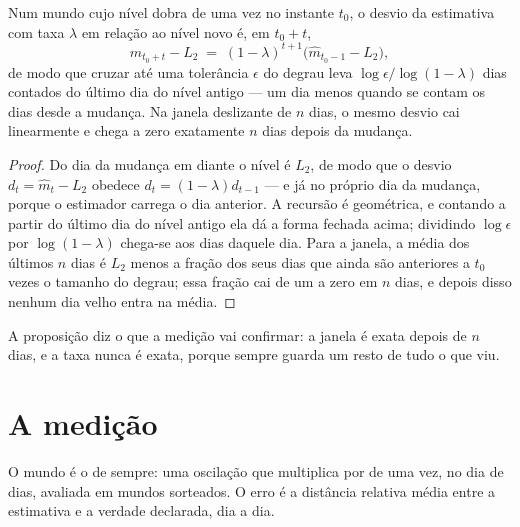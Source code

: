 \begin{proposicao}\label{prop:meia-vida}
Num mundo cujo nível dobra de uma vez no instante $t_0$, o desvio da estimativa com taxa $\lambda$
em relação ao nível novo é, em $t_0 + t$,
\[
\hat m_{t_0+t} - L_2 \;=\; (1-\lambda)^{t+1}\big(\hat m_{t_0-1} - L_2\big),
\]
de modo que cruzar até uma tolerância $\epsilon$ do degrau leva
$\log \epsilon / \log(1-\lambda)$ dias contados do último dia do nível antigo --- um dia menos
quando se contam os dias desde a mudança. Na janela deslizante de $n$ dias, o mesmo desvio cai
linearmente e chega a zero exatamente $n$ dias depois da mudança.
\end{proposicao}

\begin{proof}
Do dia da mudança em diante o nível é $L_2$, de modo que o desvio $d_t = \hat m_t - L_2$ obedece
$d_t = (1-\lambda) d_{t-1}$ --- e já no próprio dia da mudança, porque o estimador carrega o dia
anterior. A recursão é geométrica, e contando a partir do último dia do nível antigo ela dá a forma
fechada acima; dividindo $\log\epsilon$ por $\log(1-\lambda)$ chega-se aos dias daquele dia. Para a janela, a média dos últimos $n$ dias
é $L_2$ menos a fração dos seus dias que ainda são anteriores a $t_0$ vezes o tamanho do degrau; essa
fração cai de um a zero em $n$ dias, e depois disso nenhum dia velho entra na média.
\end{proof}

A proposição diz o que a medição vai confirmar: a janela é exata depois de $n$ dias, e a taxa nunca
é exata, porque sempre guarda um resto de tudo o que viu.

\section{A medição}

O mundo é o de sempre: uma oscilação que multiplica por \numEsquecimentoFator{} de uma vez, no dia
\numEsquecimentoQuando{} de \numEsquecimentoDiasDeSerie{} dias, avaliada em \numEsquecimentoSementes{} mundos sorteados. O erro é a distância relativa média
entre a estimativa e a verdade declarada, dia a dia.

